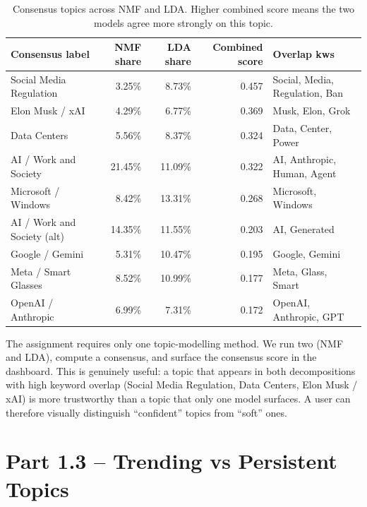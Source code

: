 \documentclass[11pt,a4paper]{article}
\newenvironment{extrabox}{%
  \par\medskip\noindent
  \def\FrameCommand{\fboxsep=6pt\fboxrule=0.6pt%
    \fcolorbox{extraboxrule}{extraboxbg}}%
  \MakeFramed{\advance\hsize-2\fboxsep\FrameRestore}%
  \noindent{\sffamily\bfseries\color{extraboxrule}Extra step.}\quad\ignorespaces%
}{\endMakeFramed\par\medskip}
\begin{document}
\begin{table}[H]
\centering
\footnotesize
\caption{Consensus topics across NMF and LDA. Higher combined score means the two models agree more
strongly on this topic.}
\label{tab:consensus}
\renewcommand{\arraystretch}{1.1}
\begin{tabularx}{\linewidth}{p{3.1cm} r r r X}
\toprule
\textbf{Consensus label} & \textbf{NMF share} & \textbf{LDA share} & \textbf{Combined score} & \textbf{Overlap kws} \\
\midrule
Social Media Regulation     & 3.25\%  & 8.73\%  & 0.457 & Social, Media, Regulation, Ban \\
Elon Musk / xAI             & 4.29\%  & 6.77\%  & 0.369 & Musk, Elon, Grok \\
Data Centers                & 5.56\%  & 8.37\%  & 0.324 & Data, Center, Power \\
AI / Work and Society       & 21.45\% & 11.09\% & 0.322 & AI, Anthropic, Human, Agent \\
Microsoft / Windows         & 8.42\%  & 13.31\% & 0.268 & Microsoft, Windows \\
AI / Work and Society (alt) & 14.35\% & 11.55\% & 0.203 & AI, Generated \\
Google / Gemini             & 5.31\%  & 10.47\% & 0.195 & Google, Gemini \\
Meta / Smart Glasses        & 8.52\%  & 10.99\% & 0.177 & Meta, Glass, Smart \\
OpenAI / Anthropic          & 6.99\%  & 7.31\%  & 0.172 & OpenAI, Anthropic, GPT \\
\bottomrule
\end{tabularx}
\end{table}

\begin{extrabox}
The assignment requires only one topic-modelling method. We run two (NMF and LDA), compute a
consensus, and surface the consensus score in the dashboard. This is genuinely useful: a topic
that appears in both decompositions with high keyword overlap (Social Media Regulation, Data
Centers, Elon Musk / xAI) is more trustworthy than a topic that only one model surfaces.
A user can therefore visually distinguish ``confident'' topics from ``soft'' ones.
\end{extrabox}

\section{Part 1.3 -- Trending vs Persistent Topics}
\label{sec:13}
\end{document}
